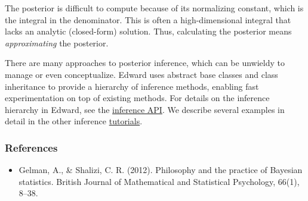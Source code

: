 The posterior is difficult to compute because of its normalizing
constant, which is the integral in the denominator.
This is often a high-dimensional integral that lacks an analytic (closed-form)
solution. Thus, calculating the posterior means \emph{approximating} the
posterior.

There are many approaches to posterior inference, which can be unwieldy to
manage or even conceptualize. Edward uses abstract base classes and class
inheritance to provide a hierarchy of inference methods, enabling fast
experimentation on top of existing methods. For details on the inference
hierarchy in Edward, see the
\href{api/inferences.html}{inference API}. We describe several examples in
detail in the other inference \href{tutorials.html}{tutorials}.


\subsubsection{References}\label{references}

\begin{itemize}
\item
  Gelman, A., & Shalizi, C. R. (2012). Philosophy and the practice of
  Bayesian statistics. British Journal of Mathematical and Statistical
  Psychology, 66(1), 8–38.
\end{itemize}
